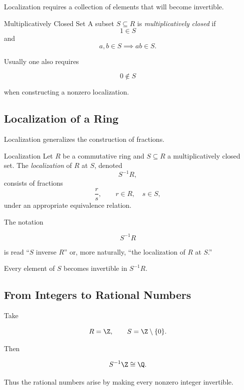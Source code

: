 Localization requires a collection of elements that will become invertible.

\begin{definitionbox}{Multiplicatively Closed Set}
A subset \(S\subseteq R\) is \emph{multiplicatively closed} if
\[ 1\in S \]
and
\[ a,b\in S\implies ab\in S. \]
\end{definitionbox}

Usually one also requires

\[ 0\notin S \]

when constructing a nonzero localization.

\subsection{Localization of a Ring}
\label{subsec:localization-ring}

Localization generalizes the construction of fractions.

\begin{definitionbox}{Localization}
Let \(R\) be a commutative ring and \(S\subseteq R\) a multiplicatively
closed set. The \emph{localization} of \(R\) at \(S\), denoted
\[ S^{-1}R, \]
consists of fractions
\[ \frac{r}{s},\qquad r\in R,\quad s\in S, \]
under an appropriate equivalence relation.
\end{definitionbox}

The notation

\[ S^{-1}R \]

is read ``\(S\) inverse \(R\)'' or, more naturally, ``the localization of
\(R\) at \(S\).''

Every element of \(S\) becomes invertible in \(S^{-1}R\).

\subsection{From Integers to Rational Numbers}
\label{subsec:localization-z-q}

Take

\[ R=\Z,\qquad S=\Z\setminus\{0\}. \]

Then

\[ S^{-1}\Z\cong\Q. \]

Thus the rational numbers arise by making every nonzero integer invertible.


